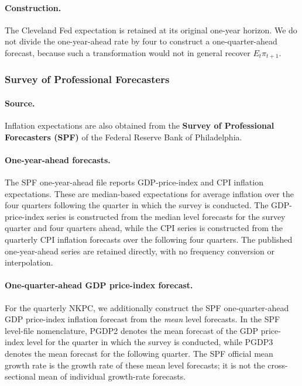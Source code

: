 \documentclass[11pt]{article}
\begin{document}
\paragraph{Construction.}
The Cleveland Fed expectation is retained at its original one-year horizon. We
do not divide the one-year-ahead rate by four to construct a one-quarter-ahead
forecast, because such a transformation would not in general recover
$E_t\pi_{t+1}$.

\subsubsection{Survey of Professional Forecasters}

\paragraph{Source.}
Inflation expectations are also obtained from the
\textbf{Survey of Professional Forecasters (SPF)} of the Federal Reserve Bank
of Philadelphia.

\paragraph{One-year-ahead forecasts.}
The SPF one-year-ahead file reports GDP-price-index and CPI inflation
expectations. These are median-based expectations for average inflation over
the four quarters following the quarter in which the survey is conducted. The
GDP-price-index series is constructed from the median level forecasts for the
survey quarter and four quarters ahead, while the CPI series is constructed
from the quarterly CPI inflation forecasts over the following four quarters.
The published one-year-ahead series are retained directly, with no frequency
conversion or interpolation.

\paragraph{One-quarter-ahead GDP price-index forecast.}
For the quarterly NKPC, we additionally construct the SPF one-quarter-ahead GDP
price-index inflation forecast from the \emph{mean} level forecasts. In the SPF
level-file nomenclature, PGDP2 denotes the mean forecast of the GDP price-index
level for the quarter in which the survey is conducted, while PGDP3 denotes the
mean forecast for the following quarter. The SPF official mean growth rate is
the growth rate of these mean level forecasts; it is not the cross-sectional
mean of individual growth-rate forecasts.
\end{document}
